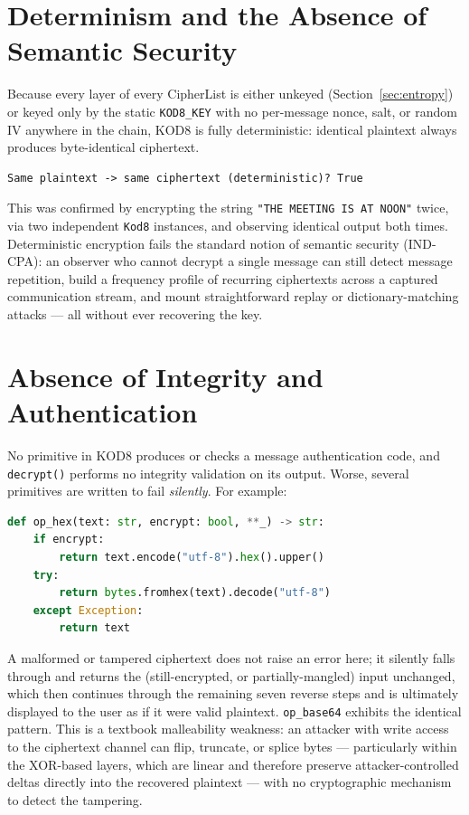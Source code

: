\documentclass[11pt]{article}
\begin{document}
\section{Determinism and the Absence of Semantic Security}
\label{sec:determinism}

Because every layer of every CipherList is either unkeyed
(Section~\ref{sec:entropy}) or keyed only by the static
\texttt{KOD8\_KEY} with no per-message nonce, salt, or random IV
anywhere in the chain, KOD8 is fully deterministic: identical plaintext
always produces byte-identical ciphertext.

\begin{lstlisting}
Same plaintext -> same ciphertext (deterministic)? True
\end{lstlisting}

This was confirmed by encrypting the string \texttt{"THE MEETING IS AT
NOON"} twice, via two independent \texttt{Kod8} instances, and observing
identical output both times. Deterministic encryption fails the standard
notion of semantic security (IND-CPA): an observer who cannot decrypt a
single message can still detect message repetition, build a
frequency profile of recurring ciphertexts across a captured
communication stream, and mount straightforward replay or
dictionary-matching attacks — all without ever recovering the key.

\section{Absence of Integrity and Authentication}

No primitive in KOD8 produces or checks a message authentication code,
and \texttt{decrypt()} performs no integrity validation on its output.
Worse, several primitives are written to fail \emph{silently}. For
example:

\begin{lstlisting}[language=Python]
def op_hex(text: str, encrypt: bool, **_) -> str:
    if encrypt:
        return text.encode("utf-8").hex().upper()
    try:
        return bytes.fromhex(text).decode("utf-8")
    except Exception:
        return text
\end{lstlisting}

A malformed or tampered ciphertext does not raise an error here; it
silently falls through and returns the (still-encrypted, or
partially-mangled) input unchanged, which then continues through the
remaining seven reverse steps and is ultimately displayed to the user as
if it were valid plaintext. \texttt{op\_base64} exhibits the identical
pattern. This is a textbook malleability weakness: an attacker with
write access to the ciphertext channel can flip, truncate, or splice
bytes — particularly within the XOR-based layers, which are linear and
therefore preserve attacker-controlled deltas directly into the
recovered plaintext — with no cryptographic mechanism to detect the
tampering.
\end{document}
